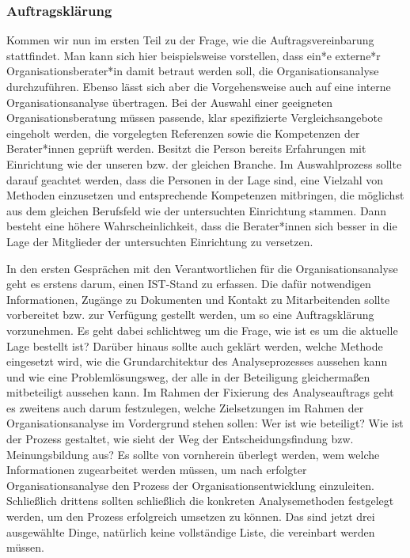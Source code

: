 \documentclass[
  letterpaper,
]{book}
\begin{document}
\subsubsection{Auftragsklärung}\label{auftragskluxe4rung}

Kommen wir nun im ersten Teil zu der Frage, wie die Auftragsvereinbarung
stattfindet. Man kann sich hier beispielsweise vorstellen, dass ein*e
externe*r Organisationsberater*in damit betraut werden soll, die
Organisationsanalyse durchzuführen. Ebenso lässt sich aber die
Vorgehensweise auch auf eine interne Organisationsanalyse übertragen.
Bei der Auswahl einer geeigneten Organisationsberatung müssen passende,
klar spezifizierte Vergleichsangebote eingeholt werden, die vorgelegten
Referenzen sowie die Kompetenzen der Berater*innen geprüft werden.
Besitzt die Person bereits Erfahrungen mit Einrichtung wie der unseren
bzw. der gleichen Branche. Im Auswahlprozess sollte darauf geachtet
werden, dass die Personen in der Lage sind, eine Vielzahl von Methoden
einzusetzen und entsprechende Kompetenzen mitbringen, die möglichst aus
dem gleichen Berufsfeld wie der untersuchten Einrichtung stammen. Dann
besteht eine höhere Wahrscheinlichkeit, dass die Berater*innen sich
besser in die Lage der Mitglieder der untersuchten Einrichtung zu
versetzen.

In den ersten Gesprächen mit den Verantwortlichen für die
Organisationsanalyse geht es erstens darum, einen IST-Stand zu erfassen.
Die dafür notwendigen Informationen, Zugänge zu Dokumenten und Kontakt
zu Mitarbeitenden sollte vorbereitet bzw. zur Verfügung gestellt werden,
um so eine Auftragsklärung vorzunehmen. Es geht dabei schlichtweg um die
Frage, wie ist es um die aktuelle Lage bestellt ist? Darüber hinaus
sollte auch geklärt werden, welche Methode eingesetzt wird, wie die
Grundarchitektur des Analyseprozesses aussehen kann und wie eine
Problemlösungsweg, der alle in der Beteiligung gleichermaßen
mitbeteiligt aussehen kann. Im Rahmen der Fixierung des Analyseauftrags
geht es zweitens auch darum festzulegen, welche Zielsetzungen im Rahmen
der Organisationsanalyse im Vordergrund stehen sollen: Wer ist wie
beteiligt? Wie ist der Prozess gestaltet, wie sieht der Weg der
Entscheidungsfindung bzw. Meinungsbildung aus? Es sollte von vornherein
überlegt werden, wem welche Informationen zugearbeitet werden müssen, um
nach erfolgter Organisationsanalyse den Prozess der
Organisationsentwicklung einzuleiten. Schließlich drittens sollten
schließlich die konkreten Analysemethoden festgelegt werden, um den
Prozess erfolgreich umsetzen zu können. Das sind jetzt drei ausgewählte
Dinge, natürlich keine vollständige Liste, die vereinbart werden müssen.
\end{document}
